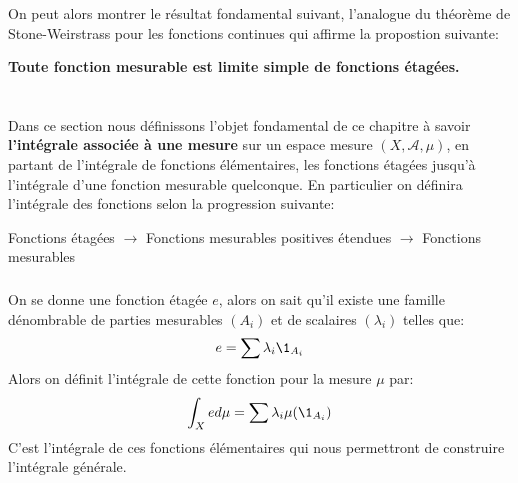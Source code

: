 \subsection*{}
On peut alors montrer le résultat fondamental suivant, l'analogue du théorème de Stone-Weirstrass pour les fonctions continues qui affirme la propostion suivante:
\begin{center}
   \textbf{Toute fonction mesurable est limite simple de fonctions étagées.}
\end{center}

\chapter*{} %
Dans ce section nous définissons l'objet fondamental de ce chapitre à savoir \textbf{l'intégrale associée à une mesure} sur un espace mesure \((X, \mathscr{A}, \mu)\), en partant de l'intégrale de fonctions élémentaires, les fonctions étagées jusqu'à l'intégrale d'une fonction mesurable quelconque. En particulier on définira l'intégrale des fonctions selon la progression suivante:
\begin{center}
   Fonctions étagées $\rightarrow$ Fonctions mesurables positives étendues $\rightarrow$ Fonctions mesurables
\end{center}
\subsection*{}
On se donne une fonction étagée \(e\), alors on sait qu'il existe une famille dénombrable de parties mesurables \((A_i)\) et de scalaires \((\lambda_i)\) telles que:
\[
   e = \sum \lambda_i \1_{A_i}
\]
Alors on définit l'intégrale de cette fonction pour la mesure \(\mu\) par:
\[
   \int_X ed\mu = \sum \lambda_i \mu(\1_{A_i})
\]
C'est l'intégrale de ces fonctions élémentaires qui nous permettront de construire l'intégrale générale.
